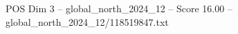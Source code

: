 \begin{textsample}{POS Dim 3 – global\_north\_2024\_12 – Score 16.00 – global\_north\_2024\_12/118519847.txt}
\end{textsample}

